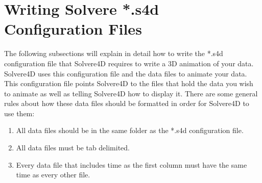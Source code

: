 \documentclass[singlecolumn,12pt]{article}
\begin{document}
\newpage
\section{Writing Solvere *.s4d Configuration Files}
\label{sec_writingConfigFiles}

The following subsections will explain in detail how to write the
*.s4d configuration file that Solvere4D requires to write a 3D
animation of your data. Solvere4D uses this configuration file and
the data files to animate your data. This configuration file points
Solvere4D to the files that hold the data you wish to animate as
well as telling Solvere4D how to display it. There are some general
rules about how these data files should be formatted in order for
Solvere4D to use them:

\begin{enumerate}
\item All data files should be in the same folder as the *.s4d
configuration file.
\item All data files must be tab delimited.
\item Every data file that includes time as the first column must
have the same time as every other file.
\end{enumerate}
\end{document}
